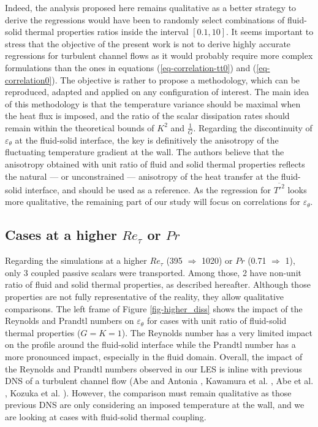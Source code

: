 \documentclass{svjour3}                     %
\begin{document}
Indeed, the analysis proposed here remains qualitative as a better strategy to derive the regressions would have been to randomly select combinations of fluid-solid thermal properties ratios inside the interval $[0.1,10]$.
It seems important to stress that the objective of the present work is not to derive highly accurate regressions for turbulent channel flows as it would probably require more complex formulations than the ones in equations (\ref{eq-correlation-tt0}) and (\ref{eq-correlation0}).
The objective is rather to propose a methodology, which can be reproduced, adapted and applied on any configuration of interest.
The main idea of this methodology is that the temperature variance should be maximal when the heat flux is imposed, and the ratio of the scalar dissipation rates should remain within the theoretical bounds of $K^2$ and $\frac{1}{G}$.
Regarding the discontinuity of $\varepsilon_\theta$ at the fluid-solid interface, the key is definitively the anisotropy of the fluctuating temperature gradient at the wall.
The authors believe that the anisotropy obtained with unit ratio of fluid and solid thermal properties reflects the natural --- or unconstrained --- anisotropy of the heat transfer at the fluid-solid interface, and should be used as a reference.
As the regression for $\overline{T'^2}$ looks more qualitative, the remaining part of our study will focus on correlations for $\varepsilon_\theta$.

\subsection{Cases at a higher $Re_\tau$ or $Pr$}
\label{subsec-les-higher}

Regarding the simulations at a higher $Re_\tau$ (395 $\Rightarrow$ 1020) or $Pr$ (0.71 $\Rightarrow$ 1), only 3 coupled passive scalars were transported.
Among those, 2 have non-unit ratio of fluid and solid thermal properties, as described hereafter.
Although those properties are not fully representative of the reality, they allow qualitative comparisons.
The left frame of Figure \ref{fig-higher_diss} shows the impact of the Reynolds and Prandtl numbers on $\varepsilon_\theta$ for cases with unit ratio of fluid-solid thermal properties ($G=K=1$).
The Reynolds number has a very limited impact on the profile around the fluid-solid interface while the Prandtl number has a more pronounced impact, especially in the fluid domain.
Overall, the impact of the Reynolds and Prandtl numbers observed in our LES is inline with previous DNS of a turbulent channel flow (Abe and Antonia \cite{abe2017relationship}, Kawamura et al. \cite{kawamura1998dns}, Abe et al. \cite{abe2004surface}, Kozuka et al. \cite{kozuka2009dns}).
However, the comparison must remain qualitative as those previous DNS are only considering an imposed temperature at the wall, and we are looking at cases with fluid-solid thermal coupling.
\end{document}
